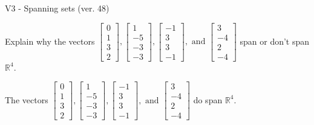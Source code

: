 \begin{exercise}
  \begin{exerciseTitle}V3 - Spanning sets (ver. 48)\end{exerciseTitle}
  \begin{exerciseStatement}
    Explain why the vectors \(\left[\begin{array}{r}
0 \\
1 \\
3 \\
2
\end{array}\right] , \left[\begin{array}{r}
1 \\
-5 \\
-3 \\
-3
\end{array}\right] , \left[\begin{array}{r}
-1 \\
3 \\
3 \\
-1
\end{array}\right] , \text{ and } \left[\begin{array}{r}
3 \\
-4 \\
2 \\
-4
\end{array}\right]\) span or don't span \(\mathbb{R}^4\). 
	


  \end{exerciseStatement}
  \begin{exerciseAnswer}
   The vectors \(\left[\begin{array}{r}
0 \\
1 \\
3 \\
2
\end{array}\right] , \left[\begin{array}{r}
1 \\
-5 \\
-3 \\
-3
\end{array}\right] , \left[\begin{array}{r}
-1 \\
3 \\
3 \\
-1
\end{array}\right] , \text{ and } \left[\begin{array}{r}
3 \\
-4 \\
2 \\
-4
\end{array}\right]\) 
  	 do  
	span \(\mathbb{R}^4\).
  


  \end{exerciseAnswer}
\end{exercise}